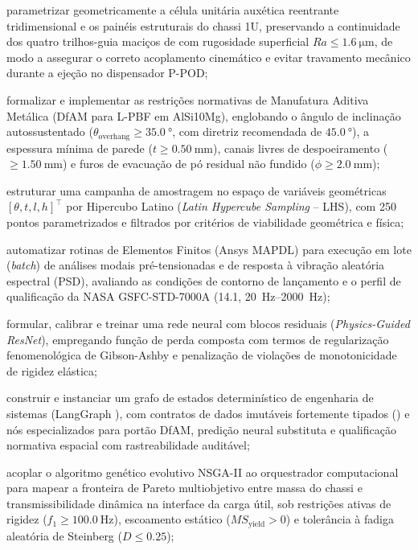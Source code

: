 \begin{alineas}
  \item parametrizar geometricamente a célula unitária auxética reentrante tridimensional e os painéis estruturais do chassi 1U, preservando a continuidade dos quatro trilhos-guia maciços de \rail{} com rugosidade superficial $Ra \le \SI{1.6}{\micro\metre}$, de modo a assegurar o correto acoplamento cinemático e evitar travamento mecânico durante a ejeção no dispensador P-POD;
  \item formalizar e implementar as restrições normativas de Manufatura Aditiva Metálica (DfAM para L-PBF em AlSi10Mg), englobando o ângulo de inclinação autossustentado ($\theta_{\text{overhang}} \ge \SI{35.0}{\degree}$, com diretriz recomendada de $\SI{45.0}{\degree}$), a espessura mínima de parede ($t \ge \SI{0.50}{\milli\metre}$), canais livres de despoeiramento ($\ge \SI{1.50}{\milli\metre}$) e furos de evacuação de pó residual não fundido ($\phi \ge \SI{2.0}{\milli\metre}$);
  \item estruturar uma campanha de amostragem no espaço de variáveis geométricas $[\theta, t, l, h]^\top$ por Hipercubo Latino (\textit{Latin Hypercube Sampling} -- LHS), com 250 pontos parametrizados e filtrados por critérios de viabilidade geométrica e física;
  \item automatizar rotinas de Elementos Finitos (Ansys MAPDL) para execução em lote (\textit{batch}) de análises modais pré-tensionadas e de resposta à vibração aleatória espectral (PSD), avaliando as condições de contorno de lançamento e o perfil de qualificação da NASA GSFC-STD-7000A (\SI{14.1}{\Grms}, \SIrange{20}{2000}{\hertz});
  \item formular, calibrar e treinar uma rede neural com blocos residuais (\textit{Physics-Guided ResNet}), empregando função de perda composta com termos de regularização fenomenológica de Gibson-Ashby e penalização de violações de monotonicidade de rigidez elástica;
  \item construir e instanciar um grafo de estados determinístico de engenharia de sistemas (LangGraph ), com contratos de dados imutáveis fortemente tipados () e nós especializados para portão DfAM, predição neural substituta e qualificação normativa espacial com rastreabilidade auditável;
  \item acoplar o algoritmo genético evolutivo NSGA-II ao orquestrador computacional para mapear a fronteira de Pareto multiobjetivo entre massa do chassi e transmissibilidade dinâmica na interface da carga útil, sob restrições ativas de rigidez ($f_1 \ge \SI{100.0}{\hertz}$), escoamento estático ($MS_{\text{yield}} > 0$) e tolerância à fadiga aleatória de Steinberg ($D \le \num{0.25}$);

\end{alineas}
